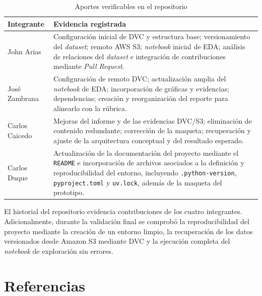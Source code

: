 \documentclass[11pt]{article}
\begin{document}
\begin{table}[h!]
\centering
\caption{Aportes verificables en el repositorio}
\label{tab:equipo}
\small
\begin{tabular}{p{3.1cm} p{8.8cm}}
\toprule
\textbf{Integrante} & \textbf{Evidencia registrada} \\
\midrule
John Arias & Configuración inicial de DVC y estructura base; versionamiento del \textit{dataset}; remoto AWS S3; \textit{notebook} inicial de EDA; análisis de relaciones del \textit{dataset} e integración de contribuciones mediante \textit{Pull Request}. \\[3pt]
José Zambrana & Configuración de remoto DVC; actualización amplia del \textit{notebook} de EDA; incorporación de gráficas y evidencias; dependencias; creación y reorganización del reporte para alinearlo con la rúbrica. \\[3pt]
Carlos Caicedo & Mejoras del informe y de las evidencias DVC/S3; eliminación de contenido redundante; corrección de la maqueta; recuperación y ajuste de la arquitectura conceptual y del resultado esperado. \\[3pt]
Carlos Duque & Actualización de la documentación del proyecto mediante el \texttt{README} e incorporación de archivos asociados a la definición y reproducibilidad del entorno, incluyendo \texttt{.python-version}, \texttt{pyproject.toml} y \texttt{uv.lock}, además de la maqueta del prototipo. \\
\bottomrule
\end{tabular}
\end{table}

El historial del repositorio evidencia contribuciones de los cuatro integrantes. Adicionalmente, durante la validación final se comprobó la reproducibilidad del proyecto mediante la creación de un entorno limpio, la recuperación de los datos versionados desde Amazon S3 mediante DVC y la ejecución completa del \textit{notebook} de exploración sin errores.

\section*{Referencias}
\end{document}
